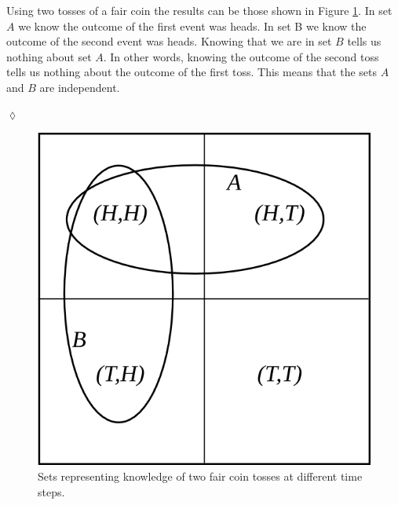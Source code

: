 \documentclass[lecture,12pt,]{pcms-l}
\begin{document}
\begin{example}
Using two tosses of a fair coin the results can be those shown in Figure \ref{fig:03coinProb}. In set $A$ we know the outcome of the first event was heads. In set B we know the outcome of the second event was heads. Knowing that we are in set $B$ tells us nothing about set $A$. In other words, knowing the outcome of the second toss tells us nothing about the outcome of the first toss. This means that the sets $A$ and $B$ are independent.
\end{example}
$\lozenge$
\begin{figure}[ht!]
	\centering
	\includegraphics[width=.3\textwidth]{images/03coinProb}
	\caption{Sets representing knowledge of two fair coin tosses at different time steps.}
	\label{fig:03coinProb}
\end{figure}
\end{document}
